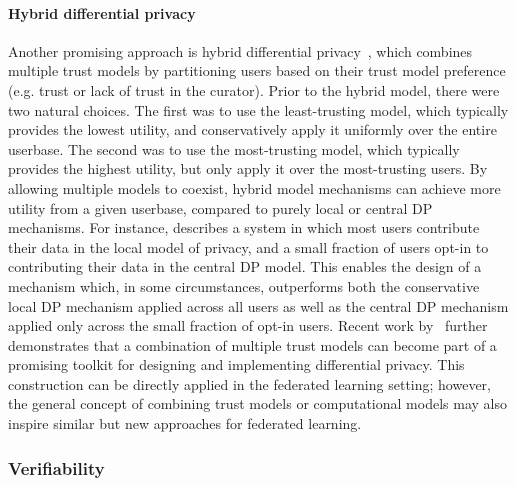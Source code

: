 \documentclass[11pt]{article}
\begin{document}
\paragraph{Hybrid differential privacy}  Another promising approach is hybrid differential privacy~\cite{avent2017blender}, which combines multiple trust models by partitioning users based on their trust model preference (e.g. trust or lack of trust in the curator). Prior to the hybrid model, there were two natural choices. The first was to use the least-trusting model, which typically provides the lowest utility, and conservatively apply it uniformly over the entire userbase. The second was to use the most-trusting model, which typically provides the highest utility, but only apply it over the most-trusting users. By allowing multiple models to coexist, hybrid model mechanisms can achieve more utility from a given userbase, compared to purely local or central DP mechanisms. For instance, \cite{avent2017blender} describes a system in which most users contribute their data in the local model of privacy, and a small fraction of users opt-in to contributing their data in the central DP model. This enables the design of a mechanism which, in some circumstances, outperforms both the conservative local DP mechanism applied across all users as well as the central DP mechanism applied only across the small fraction of opt-in users. Recent work by~\cite{beimel2019power} further demonstrates that a combination of multiple trust models can become part of a promising toolkit for designing and implementing differential privacy. This construction can be directly applied in the federated learning setting; however, the general concept of combining trust models or computational models may also inspire similar but new approaches for federated learning. 



\subsubsection{Verifiability}
\label{sssec:verifiability}

\end{document}
